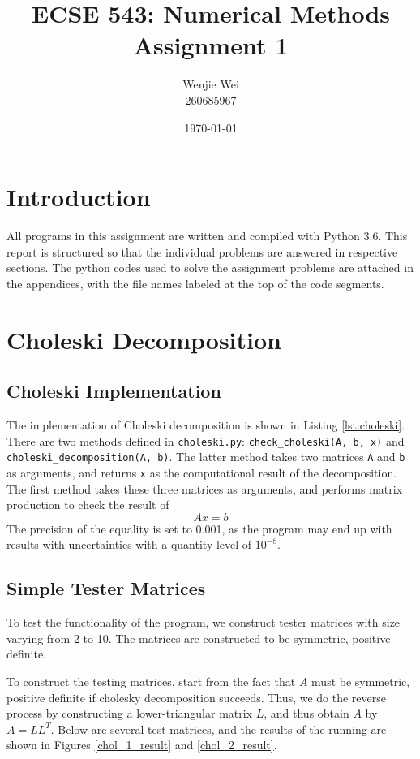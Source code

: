 \documentclass[a4paper,titlepage]{article}
\title{\textbf{ECSE 543: Numerical Methods} \\ Assignment 1}
\author{Wenjie Wei \\ 260685967}
\date{\today}
\begin{document}
	\sloppy
	
	\maketitle
	
	\tableofcontents
	
	
	\twocolumn
	
	\section{Introduction}
	
	All programs in this assignment are written and compiled with Python 3.6. This report is structured so that the individual problems are answered in respective sections. The python codes used to solve the assignment problems are attached in the appendices, with the file names labeled at the top of the code segments.
	
	\section{Choleski Decomposition}
		\subsection{Choleski Implementation}
			The implementation of Choleski decomposition is shown in Listing \ref{lst:choleski}. There are two methods defined in \texttt{choleski.py}: \texttt{check_choleski(A, b, x)} and \texttt{choleski_decomposition(A, b)}. The latter method takes two matrices \texttt{A} and \texttt{b} as arguments, and returns \texttt{x} as the computational result of the decomposition. The first method takes these three matrices as arguments, and performs matrix production to check the result of
			$$
				Ax = b
			$$ 
			The precision of the equality is set to 0.001, as the program may end up with results with uncertainties with a quantity level of $10^{-8}$.
			
		\subsection{Simple Tester Matrices}
			To test the functionality of the program, we construct tester matrices with size varying from 2 to 10. The matrices are constructed to be symmetric, positive definite. 
			
			To construct the testing matrices, start from the fact that $A$ must be symmetric, positive definite if cholesky decomposition succeeds. Thus, we do the reverse process by constructing a lower-triangular matrix $L$, and thus obtain $A$ by $A = LL^T$. Below are several test matrices, and the results of the running are shown in Figures \ref{chol_1_result} and \ref{chol_2_result}.
			
\end{document}
